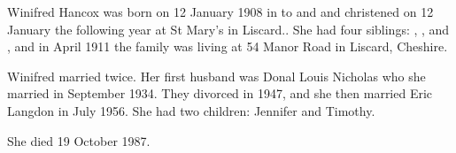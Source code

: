 
Winifred Hancox was born on 12 January 1908 in \cite{BMD1907} to  and  \cite{WHancoxBirth} and christened on 12 January the following year at St Mary's in Liscard.\cite{ParishReg}. She had four siblings: , ,  and , and in April 1911 the family was living at 54 Manor Road in Liscard, Cheshire.\cite{1911Census}

Winifred married twice.  Her first husband was Donal Louis Nicholas who she married in September 1934.  They divorced in 1947, and she then married Eric Langdon in July 1956.  She had two children: Jennifer and Timothy.

She died 19 October 1987.
